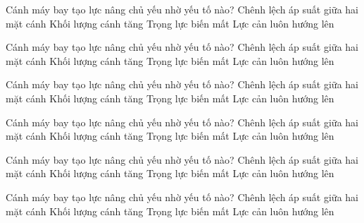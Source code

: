 \begin{ex}
Cánh máy bay tạo lực nâng chủ yếu nhờ yếu tố nào?
\choice
{\True Chênh lệch áp suất giữa hai mặt cánh}
{Khối lượng cánh tăng}
{Trọng lực biến mất}
{Lực cản luôn hướng lên}
\end{ex}

\begin{ex}
Cánh máy bay tạo lực nâng chủ yếu nhờ yếu tố nào?
\choice
{\True Chênh lệch áp suất giữa hai mặt cánh}
{Khối lượng cánh tăng}
{Trọng lực biến mất}
{Lực cản luôn hướng lên}
\end{ex}

\begin{ex}
Cánh máy bay tạo lực nâng chủ yếu nhờ yếu tố nào?
\choice
{\True Chênh lệch áp suất giữa hai mặt cánh}
{Khối lượng cánh tăng}
{Trọng lực biến mất}
{Lực cản luôn hướng lên}
\end{ex}

\begin{ex}
Cánh máy bay tạo lực nâng chủ yếu nhờ yếu tố nào?
\choice
{\True Chênh lệch áp suất giữa hai mặt cánh}
{Khối lượng cánh tăng}
{Trọng lực biến mất}
{Lực cản luôn hướng lên}
\end{ex}

\begin{ex}
Cánh máy bay tạo lực nâng chủ yếu nhờ yếu tố nào?
\choice
{\True Chênh lệch áp suất giữa hai mặt cánh}
{Khối lượng cánh tăng}
{Trọng lực biến mất}
{Lực cản luôn hướng lên}
\end{ex}

\begin{ex}
Cánh máy bay tạo lực nâng chủ yếu nhờ yếu tố nào?
\choice
{\True Chênh lệch áp suất giữa hai mặt cánh}
{Khối lượng cánh tăng}
{Trọng lực biến mất}
{Lực cản luôn hướng lên}
\end{ex}

